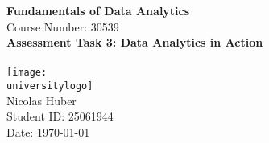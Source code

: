 \documentclass[10pt]{article}
\newcommand{\Course}{Fundamentals of Data Analytics} %
\newcommand{\CourseNo}{30539} %
\newcommand{\Title}{Assessment Task 3: Data Analytics in Action} %
\newcommand{\StudentName}{Nicolas Huber} %
\newcommand{\StudentId}{25061944} %
\begin{document}
\begin{titlepage}
    \centering
    \vspace*{1cm}
    \Huge
    \textbf{\Course}\\
    \vspace{0.5cm}
    \LARGE
    Course Number: \CourseNo\\
    \vspace{1.5cm}
    \textbf{\Title}\\
    \vspace{2cm}
    \textbf{\universitytext}\\
    \vfill
    \texttt{[image: \\universitylogo]}\\
    \vfill
    \Large
    \StudentName\\
    Student ID: \StudentId\\
    Date: \today
\end{titlepage}

\tableofcontents
\newpage


\newpage

\newpage

\newpage
\appendix

\newpage


\end{document}
